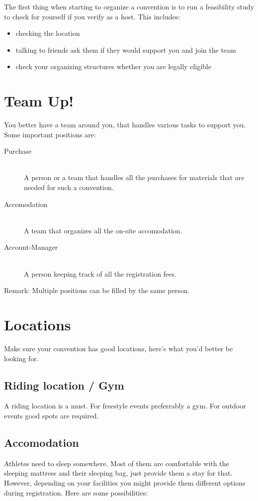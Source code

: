 \documentclass[11pt]{report}
\begin{document}
The first thing when starting to organize a convention is to run a feasibility 
study to check for yourself if you verify as a host. This includes:

\begin{itemize}
	\item checking the location
	\item talking to friends ask them if they would support you and join the team
	\item check your organizing structures whether you are legally eligible
\end{itemize}

\section{Team Up!}

You better have a team around you, that handles various tasks to support you. 
Some important positions are:

\begin{description}
	\item [Purchase] \hfill \\
	A person or a team that handles all the purchases for materials that are needed 
	for such a convention.
	\item [Accomodation] \hfill \\
	A team that organizes all the on-site accomodation.
	\item [Account-Manager] \hfill \\
	A person keeping track of all the registration fees.
\end{description}

Remark: Multiple positions can be filled by the same person.

\section{Locations}

Make sure your convention has good locations, here's what you'd better be 
looking for.

\subsection{Riding location / Gym}

A riding location is a must. For freestyle events preferrably a gym. For outdoor 
events good spots are required.

\subsection{Accomodation}
Athletes need to sleep somewhere. Most of them are comfortable with the sleeping 
mattress and their sleeping bag, just provide them a stay for that. However, 
depending on your facilities you might provide them different options during 
registration. Here are some possibilities:
\end{document}
